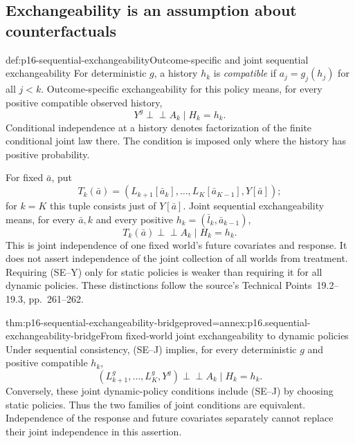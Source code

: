 \subsection{Exchangeability is an assumption about counterfactuals}

\begin{hbdefinition}{def:p16-sequential-exchangeability}{Outcome-specific and joint sequential exchangeability}
For deterministic \(g\), a history \(h_k\) is \emph{compatible} if
\(a_j=g_j(h_j)\) for all \(j<k\). Outcome-specific exchangeability for
this policy means, for every positive compatible observed history,
\[
 Y^g\mathrel{\perp\!\!\!\perp} A_k\mid H_k=h_k.
 \tag{SE--Y}
\]
Conditional independence at a history denotes factorization of the finite
conditional joint law there. The condition is imposed only where the
history has positive probability.

For fixed \(\bar a\), put
\[
 T_k(\bar a)=
 (L_{k+1}[\bar a_k],\ldots,L_K[\bar a_{K-1}],Y[\bar a]);
\]
for \(k=K\) this tuple consists just of \(Y[\bar a]\).
Joint sequential exchangeability means, for every \(\bar a,k\) and every
positive \(h_k=(\bar l_k,\bar a_{k-1})\),
\[
 T_k(\bar a)\mathrel{\perp\!\!\!\perp} A_k\mid H_k=h_k.
 \tag{SE--J}
\]
This is joint independence of one fixed world's future covariates and
response. It does not assert independence of the joint collection of all
worlds from treatment. Requiring (SE--Y) only for static policies is weaker
than requiring it for all dynamic policies. These distinctions follow the
source's Technical Points~19.2--19.3, pp.~261--262.
\end{hbdefinition}

\begin{hbtheorem}{thm:p16-sequential-exchangeability-bridge}{proved=annex:p16.sequential-exchangeability-bridge}{From fixed-world joint exchangeability to dynamic policies}
Under sequential consistency, (SE--J) implies, for every deterministic
\(g\) and positive compatible \(h_k\),
\[
 (L_{k+1}^g,\ldots,L_K^g,Y^g)
 \mathrel{\perp\!\!\!\perp} A_k\mid H_k=h_k.
\]
Conversely, these joint dynamic-policy conditions include (SE--J) by
choosing static policies. Thus the two families of joint conditions are
equivalent. Independence of the response and future covariates separately
cannot replace their joint independence in this assertion.
\end{hbtheorem}

